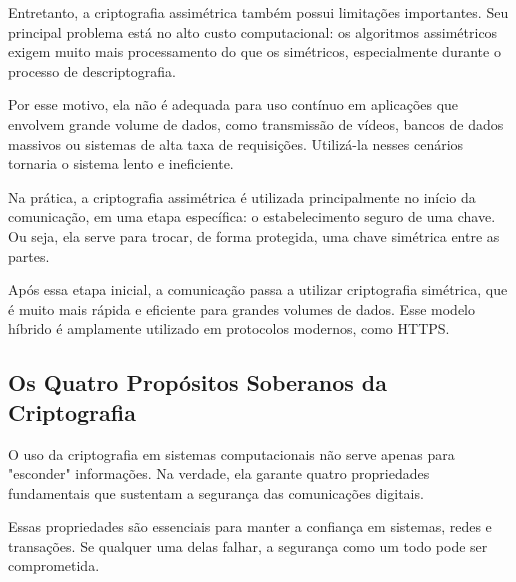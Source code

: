 \documentclass[12pt,a4paper,twoside]{report}
\begin{document}
Entretanto, a criptografia assimétrica também possui limitações importantes. Seu principal problema está no alto custo computacional: os algoritmos assimétricos exigem muito mais processamento do que os simétricos, especialmente durante o processo de descriptografia.

Por esse motivo, ela não é adequada para uso contínuo em aplicações que envolvem grande volume de dados, como transmissão de vídeos, bancos de dados massivos ou sistemas de alta taxa de requisições. Utilizá-la nesses cenários tornaria o sistema lento e ineficiente.

Na prática, a criptografia assimétrica é utilizada principalmente no início da comunicação, em uma etapa específica: o estabelecimento seguro de uma chave. Ou seja, ela serve para trocar, de forma protegida, uma chave simétrica entre as partes.

Após essa etapa inicial, a comunicação passa a utilizar criptografia simétrica, que é muito mais rápida e eficiente para grandes volumes de dados. Esse modelo híbrido é amplamente utilizado em protocolos modernos, como HTTPS.

\subsection{Os Quatro Propósitos Soberanos da Criptografia}

O uso da criptografia em sistemas computacionais não serve apenas para "esconder" informações. Na verdade, ela garante quatro propriedades fundamentais que sustentam a segurança das comunicações digitais.

Essas propriedades são essenciais para manter a confiança em sistemas, redes e transações. Se qualquer uma delas falhar, a segurança como um todo pode ser comprometida.
\end{document}
